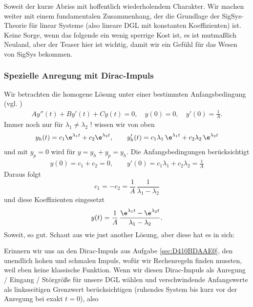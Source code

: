 Soweit der kurze Abriss mit hoffentlich wiederholendem Charakter.
%
Wir machen weiter mit einem fundamentalen Zusammenhang, der die Grundlage der
SigSys-Theorie für linear Systeme (also lineare DGL mit konstanten Koeffizienten)
ist.
%
Keine Sorge, wenn das folgende ein wenig sperrige Kost ist, es ist mutmaßlich
Neuland, aber der Teaser hier ist wichtig, damit wir ein Gefühl für das Wesen von SigSys
bekommen.

\subsubsection{Spezielle Anregung mit Dirac-Impuls}
Wir betrachten die homogene Lösung unter einer bestimmten Anfangsbedingung
(vgl. \cite[S.97]{Strang2014})
\begin{align}
A y''(t) + B y'(t) + C y(t) = 0,\quad y(0)=0,\quad y'(0)=\frac{1}{A}.
\end{align}
%
Immer noch nur für $\lambda_1 \neq \lambda_2$ ! wissen wir von oben
\begin{align}
y_h(t) = c_1 \e^{\lambda_1 t} + c_2 \e^{\lambda_2 t},\qquad
y_h'(t) = c_1 \lambda_1 \, \e^{\lambda_1 t} + c_2 \lambda_2 \, \e^{\lambda_2 t}
\end{align}
und mit $y_p=0$ wird für $y=y_h+y_p=y_h$.
Die Anfangsbedingungen berücksichtigt
\begin{align}
y(0) = c_1 + c_2 = 0,\qquad
y'(0) = c_1 \lambda_1 + c_2 \lambda_2 = \frac{1}{A}
\end{align}
Daraus folgt
\begin{equation}
c_1 = -c_2 = \frac{1}{A} \, \frac{1}{\lambda_1 - \lambda_2}
\end{equation}
und diese Koeffizienten eingesetzt
\begin{align}
\label{sec:A7BEE9E24E_hyh}
y(t) =
\frac{1}{A} \, \frac{\e^{\lambda_1 t} - \e^{\lambda_2 t}}{\lambda_1 - \lambda_2}.
\end{align}
%
Soweit, so gut. Schaut aus wie just another Lösung, aber diese hat es in sich:
%

Erinnern wir uns an den Dirac-Impuls aus Aufgabe \ref{sec:D410BDAAE0},
den unendlich hohen und schmalen Impuls,
wofür wir Rechenregeln finden mussten, weil eben keine klassische Funktion.
%
Wenn wir diesen Dirac-Impuls als Anregung / Eingang / Störgröße für unsere DGL
wählen und verschwindende Anfangswerte als linksseitigen Grenzwert
berücksichtigen (ruhendes System bis kurz vor der Anregung bei exakt $t=0$), also


